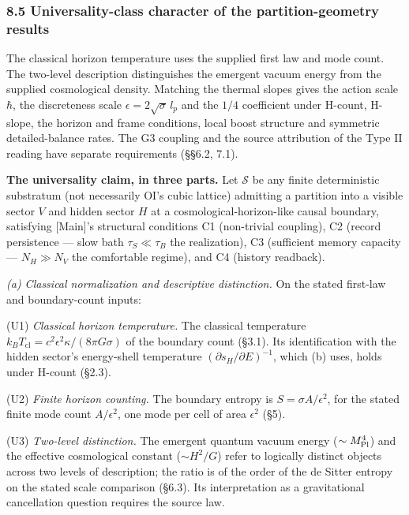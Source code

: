 \documentclass[
]{article}
\begin{document}
\hypertarget{universality-class-character-of-the-partition-geometry-results}{%
\subsubsection{8.5 Universality-class character of the
partition-geometry
results}\label{universality-class-character-of-the-partition-geometry-results}}

The classical horizon temperature uses the supplied first law and mode
count. The two-level description distinguishes the emergent vacuum
energy from the supplied cosmological density. Matching the thermal
slopes gives the action scale \(\hbar\), the discreteness scale
\(\epsilon=2\sqrt{\sigma}\,l_p\) and the \(1/4\) coefficient under
H-count, H-slope, the horizon and frame conditions, local boost
structure and symmetric detailed-balance rates. The G3 coupling and the
source attribution of the Type II reading have separate requirements
(§§6.2, 7.1).

\textbf{The universality claim, in three parts.} Let \(\mathcal{S}\) be
any finite deterministic substratum (not necessarily OI's cubic lattice)
admitting a partition into a visible sector \(V\) and hidden sector
\(H\) at a cosmological-horizon-like causal boundary, satisfying
{[}Main{]}'s structural conditions C1 (non-trivial coupling), C2 (record
persistence --- slow bath \(\tau_S \ll \tau_B\) the realization), C3
(sufficient memory capacity --- \(N_H \gg N_V\) the comfortable regime),
and C4 (history readback).

\emph{(a) Classical normalization and descriptive distinction.} On the
stated first-law and boundary-count inputs:

(U1) \emph{Classical horizon temperature.} The classical temperature
\(k_B T_{\text{cl}} = c^2\epsilon^2\kappa/(8\pi G\sigma)\) of the
boundary count (§3.1). Its identification with the hidden sector's
energy-shell temperature \((\partial s_H/\partial E)^{-1}\), which (b)
uses, holds under H-count (§2.3).

(U2) \emph{Finite horizon counting.} The boundary entropy is
\(S = \sigma A/\epsilon^2\), for the stated finite mode count
\(A/\epsilon^2\), one mode per cell of area \(\epsilon^2\) (§5).

(U3) \emph{Two-level distinction.} The emergent quantum vacuum energy
(\(\sim M_{\rm Pl}^4\)) and the effective cosmological constant
(\(\sim H^2/G\)) refer to logically distinct objects across two levels
of description; the ratio is of the order of the de Sitter entropy on
the stated scale comparison (§6.3). Its interpretation as a
gravitational cancellation question requires the source law.
\end{document}
